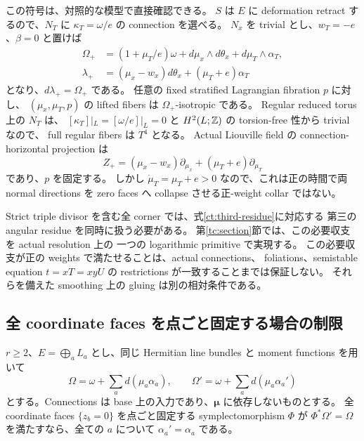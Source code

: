 \begin{remark}
\label{ct:negative-weight}
この符号は、対照的な模型で直接確認できる。
$S$ は $E$ に deformation retract するので、$N_T$ に
$\kappa_T=\omega/e$ の connection を選べる。
$N_x$ を trivial とし、$w_T=-e$、$\beta=0$ と置けば
\begin{align*}
 \Omega_+&=(1+\mu_T/e)\omega
       +d\mu_x\wedge d\theta_x+d\mu_T\wedge\alpha_T,\\
 \lambda_+&=(\mu_x-w_x)d\theta_x+(\mu_T+e)\alpha_T
\end{align*}
となり、$d\lambda_+=\Omega_+$ である。
任意の fixed stratified Lagrangian fibration $p$ に対し、
$(\mu_x,\mu_T,p)$ の lifted fibers は $\Omega_+$-isotropic である。
Regular reduced torus 上の $N_T$ は、
$[\kappa_T]|_L=[\omega/e]|_L=0$ と $H^2(L;\mathbb Z)$ の torsion-free 性から trivial なので、
full regular fibers は $T^4$ となる。
Actual Liouville field の connection-horizontal projection は
\[
 Z_+=(\mu_x-w_x)\partial_{\mu_x}
                   +(\mu_T+e)\partial_{\mu_T}
\]
であり、$p$ を固定する。
しかし $\dot\mu_T=\mu_T+e>0$ なので、これは正の時間で両 normal directions を
zero faces へ collapse させる正-weight collar ではない。
\end{remark}

Strict triple divisor を含む全 corner では、式\eqref{ct:third-residue}に対応する
第三の angular residue を同時に扱う必要がある。
第\ref{tc:section}節では、この必要収支を actual resolution 上の
一つの logarithmic primitive で実現する。
この必要収支が正の weights で満たせることは、actual connections、
foliations、semistable equation $t=xT=xyU$ の restrictions が一致することまでは保証しない。
それらを備えた smoothing 上の gluing は別の相対条件である。

\subsection{全 coordinate faces を点ごと固定する場合の制限}
\label{ct:fixed-faces}

\begin{lemma}
\label{ct:face-rigidity}
$r\ge2$、$E=\bigoplus_aL_a$ とし、同じ Hermitian line bundles と moment functions を用いて
\[
 \Omega=\omega+\sum_a d(\mu_a\alpha_a),
 \qquad
 \Omega'=\omega+\sum_a d(\mu_a\alpha_a')
\]
とする。Connections は base 上の入力であり、$\boldsymbol\mu$ に依存しないものとする。
全 coordinate faces $\{z_b=0\}$ を点ごと固定する symplectomorphism $\Phi$ が
$\Phi^*\Omega'=\Omega$ を満たすなら、全ての $a$ について $\alpha_a'=\alpha_a$ である。
\end{lemma}

